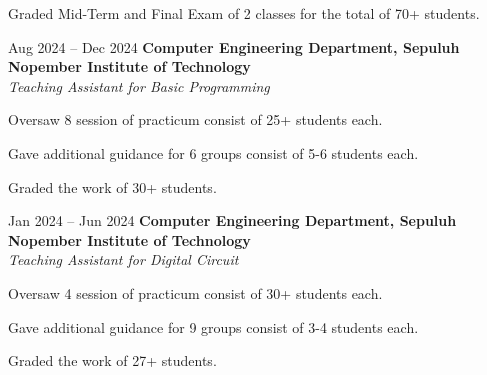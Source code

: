     \vspace{0.10 cm}
    \begin{onecolentry}
        \begin{highlights}
            \item Graded Mid-Term and Final Exam of 2 classes for the total of 70+ students.
            \end{highlights}
    \end{onecolentry}

    \vspace{0.2 cm}

    \begin{twocolentry}{
        Aug 2024 – Dec 2024
    }
    \textbf{Computer Engineering Department, Sepuluh Nopember Institute of Technology}\\
    \textit{Teaching Assistant for Basic Programming}
    \end{twocolentry}

    \vspace{0.10 cm}
    \begin{onecolentry}
        \begin{highlights}
            \item Oversaw 8 session of practicum consist of 25+ students each.
            \item Gave additional guidance for 6 groups consist of 5-6 students each.
            \item Graded the work of 30+ students.
        \end{highlights}
    \end{onecolentry}

    \vspace{0.2 cm}

    \begin{twocolentry}{
        Jan 2024 – Jun 2024
    }
    \textbf{Computer Engineering Department, Sepuluh Nopember Institute of Technology}\\
    \textit{Teaching Assistant for Digital Circuit}
    \end{twocolentry}

    \vspace{0.10 cm}
    \begin{onecolentry}
        \begin{highlights}
            \item Oversaw 4 session of practicum consist of 30+ students each.
            \item Gave additional guidance for 9 groups consist of 3-4 students each.
            \item Graded the work of 27+ students.
        \end{highlights}
    \end{onecolentry}

